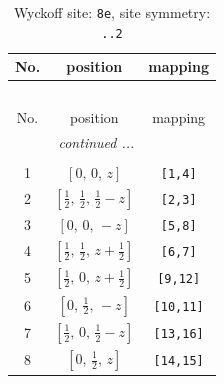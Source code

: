 \documentclass[fleqn,8pt]{jsarticle}
\begin{document}
\renewcommand{\arraystretch}{1.2}
\begin{longtable}{ccc}
\caption{Wyckoff site: {\tt 8e}, site symmetry: {\tt ..2}}
 \\
 \hline \hline
No. & position & mapping \\ \hline \endfirsthead

\multicolumn{2}{l}{\tablename\ \thetable{}} \\
 \hline \hline
No. & position & mapping \\ \hline \endhead

 \hline \hline
\multicolumn{2}{r}{\footnotesize\it continued ...} \\ \endfoot

 \hline \hline
\multicolumn{2}{r}{} \\ \endlastfoot

1 & $\left[ 0,\, 0,\, z \right]$ & {\tt [1,4]} \\ \hline
2 & $\left[ \frac{1}{2},\, \frac{1}{2},\, \frac{1}{2} - z \right]$ & {\tt [2,3]} \\ \hline
3 & $\left[ 0,\, 0,\, - z \right]$ & {\tt [5,8]} \\ \hline
4 & $\left[ \frac{1}{2},\, \frac{1}{2},\, z + \frac{1}{2} \right]$ & {\tt [6,7]} \\ \hline
5 & $\left[ \frac{1}{2},\, 0,\, z + \frac{1}{2} \right]$ & {\tt [9,12]} \\ \hline
6 & $\left[ 0,\, \frac{1}{2},\, - z \right]$ & {\tt [10,11]} \\ \hline
7 & $\left[ \frac{1}{2},\, 0,\, \frac{1}{2} - z \right]$ & {\tt [13,16]} \\ \hline
8 & $\left[ 0,\, \frac{1}{2},\, z \right]$ & {\tt [14,15]} \\
\end{longtable}
\renewcommand{\arraystretch}{1.2}
\end{document}
